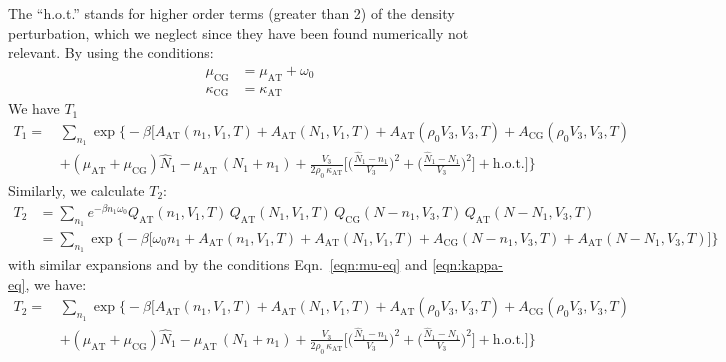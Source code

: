 \documentclass[aip,jcp,a4paper,reprint,onecolumn]{revtex4-1}
\newcommand{\AT}{{\textrm{{AT}}}}
\newcommand{\CG}{{\textrm{CG}}}
\begin{document}
The ``h.o.t.'' stands for higher order terms (greater than 2)
of the density perturbation, which we neglect since they have been found numerically not relevant.
By using the conditions:
\begin{align}\label{eqn:mu-eq}
  \mu_{\CG} &= \mu_{\AT} + \omega_0\\\label{eqn:kappa-eq}
  \kappa_{\CG} &= \kappa_{\AT}
\end{align}
We have $T_1$
\begin{align}\nonumber
  T_1
  = \,&
  \sum_{n_1}
  \exp
  \Big\{-\beta
  \Big[
  A_{\AT}(n_1,V_1,T) +
  A_{\AT}(N_1,V_1,T) +
  A_{\AT}(\rho_0V_3,V_3,T) +
  A_{\CG}(\rho_0V_3,V_3,T) \\
  \,&+(\mu_\AT + \mu_\CG)\hat N_1
  -\mu_{\AT}\,(N_1 + n_1) +
  \frac{V_3}{2\rho_0\, \kappa_{\AT}}
  \Big[
  \Big(
  \frac{\hat N_1 - n_1}{V_3}
  \Big)^2
  +
  \Big(
  \frac{\hat N_1 - N_1}{V_3}
  \Big)^2
  \Big]
  +\textrm{h.o.t.}
  \Big]
  \Big\}
\end{align}
Similarly, we calculate $T_2$:
\begin{align}\nonumber
  T_2
  &=
  \sum_{n_1}
  e^{-\beta n_1\omega_0}
  Q_{\AT}(n_1,V_1,T)\,
  Q_{\AT}(N_1,V_1,T)\,
  Q_{\CG}(N-n_1,V_3,T)\,
  Q_{\AT}(N-N_1,V_3,T) \\\nonumber
  &=
  \sum_{n_1}
  \exp
  \big\{-\beta
  \big[
  \omega_0n_1 +
  A_{\AT}(n_1,V_1,T) +
  A_{\AT}(N_1,V_1,T) +
  A_{\CG}(N-n_1,V_3,T) +
  A_{\AT}(N-N_1,V_3,T)
  \big]
  \big\}
\end{align}
with similar expansions and by the conditions Eqn.~\eqref{eqn:mu-eq}
and \eqref{eqn:kappa-eq}, we have:
\begin{align}\nonumber
  T_2
  = \,&
  \sum_{n_1}
  \exp
  \Big\{-\beta
  \Big[
  A_{\AT}(n_1,V_1,T) +
  A_{\AT}(N_1,V_1,T) +
  A_{\AT}(\rho_0V_3,V_3,T) +
  A_{\CG}(\rho_0V_3,V_3,T) \\
  \,&+(\mu_\AT + \mu_\CG)\hat N_1
  -\mu_{\AT}\,(N_1 + n_1) +
  \frac{V_3}{2\rho_0\, \kappa_{\AT}}
  \Big[
  \Big(
  \frac{\hat N_1 - n_1}{V_3}
  \Big)^2
  +
  \Big(
  \frac{\hat N_1 - N_1}{V_3}
  \Big)^2
  \Big]
  +\textrm{h.o.t.}
  \Big]
  \Big\}
\end{align}
\end{document}
